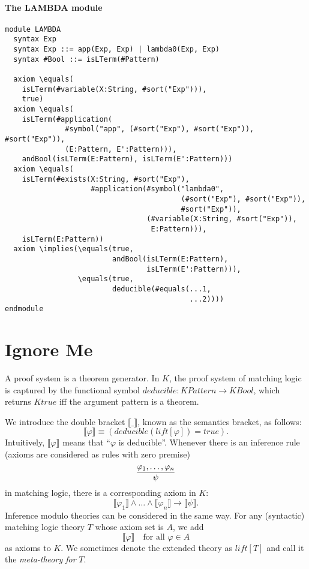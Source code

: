 \documentclass[UTF8]{article}
\theoremstyle{plain}
\theoremstyle{definition}
\theoremstyle{remark}
\newcommand{\Bracket}[1]
    {\llbracket#1\rrbracket}
\newcommand{\KBool}{\mathit{KBool}}
\newcommand{\Ktrue}{\mathit{Ktrue}}
\newcommand{\KPattern}{\mathit{KPattern}}
\begin{document}
\paragraph{The {\small LAMBDA} module}\quad
\begin{Verbatim}[fontsize=\small]
module LAMBDA
  syntax Exp
  syntax Exp ::= app(Exp, Exp) | lambda0(Exp, Exp)
  syntax #Bool ::= isLTerm(#Pattern)

  axiom \equals(
    isLTerm(#variable(X:String, #sort("Exp"))), 
    true)
  axiom \equals(
    isLTerm(#application(
              #symbol("app", (#sort("Exp"), #sort("Exp")), #sort("Exp")),
              (E:Pattern, E':Pattern))),
    andBool(isLTerm(E:Pattern), isLTerm(E':Pattern)))
  axiom \equals(
    isLTerm(#exists(X:String, #sort("Exp"),
                    #application(#symbol("lambda0",
                                         (#sort("Exp"), #sort("Exp")),
                                         #sort("Exp")),
                                 (#variable(X:String, #sort("Exp")),
                                  E:Pattern))),
    isLTerm(E:Pattern))
  axiom \implies(\equals(true, 
                         andBool(isLTerm(E:Pattern), 
                                 isLTerm(E':Pattern))),
                 \equals(true,
                         deducible(#equals(...1,
                                           ...2)))) 
endmodule
\end{Verbatim}

\section{Ignore Me}
A proof system is a theorem generator. 
In $K$, the proof system of matching logic is captured by the functional symbol 
$\mathit{deducible} \colon \KPattern \to \KBool$, which returns $\Ktrue$ 
iff the argument pattern is a theorem. 

We introduce the double bracket $\Bracket{\_}$, known as the semantics bracket, as follows:
\begin{equation*}
\Bracket{\varphi} \equiv 
\left(\textit{deducible}\left(\mathit{lift}[\varphi]\right) = true\right).
\end{equation*}
Intuitively, $\Bracket{\varphi}$ means that ``$\varphi$ is deducible''.
Whenever there is an inference rule (axioms are considered as rules with zero 
premise)
$$
\infer{\psi}
{\varphi_1,\dots,\varphi_n}
$$
in matching logic, there is a corresponding axiom in $K$:
$$
\Bracket{\varphi_1} \wedge \dots \wedge \Bracket{\varphi_n} \to \Bracket{\psi}.
$$
Inference modulo theories can be considered in the same way. 
For any (syntactic) matching logic theory $T$ whose axiom set is $A$, we add
$$
\Bracket{\varphi} \quad \text{for all $\varphi \in A$}
$$
as axioms to $K$. We sometimes denote the extended theory as $\mathit{lift}[T]$ 
and call it 
the \emph{meta-theory for} $T$.



\end{document}
